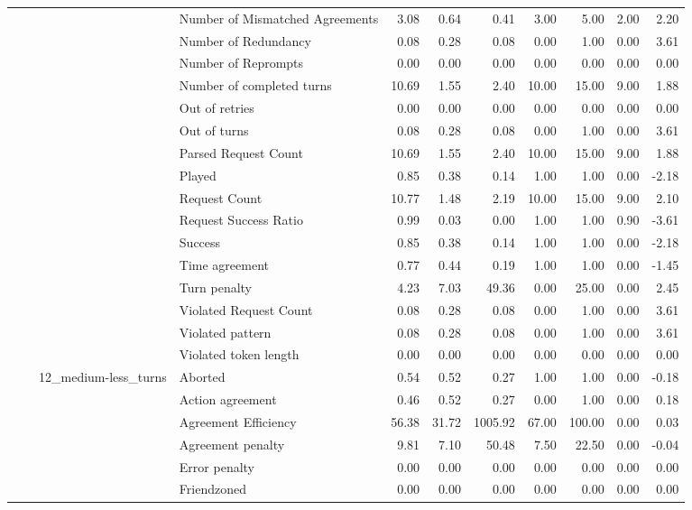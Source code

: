 \begin{tabular}{llllrrrrrrr}
 &  &  & Number of Mismatched Agreements & 3.08 & 0.64 & 0.41 & 3.00 & 5.00 & 2.00 & 2.20 \\
 &  &  & Number of Redundancy & 0.08 & 0.28 & 0.08 & 0.00 & 1.00 & 0.00 & 3.61 \\
 &  &  & Number of Reprompts & 0.00 & 0.00 & 0.00 & 0.00 & 0.00 & 0.00 & 0.00 \\
 &  &  & Number of completed turns & 10.69 & 1.55 & 2.40 & 10.00 & 15.00 & 9.00 & 1.88 \\
 &  &  & Out of retries & 0.00 & 0.00 & 0.00 & 0.00 & 0.00 & 0.00 & 0.00 \\
 &  &  & Out of turns & 0.08 & 0.28 & 0.08 & 0.00 & 1.00 & 0.00 & 3.61 \\
 &  &  & Parsed Request Count & 10.69 & 1.55 & 2.40 & 10.00 & 15.00 & 9.00 & 1.88 \\
 &  &  & Played & 0.85 & 0.38 & 0.14 & 1.00 & 1.00 & 0.00 & -2.18 \\
 &  &  & Request Count & 10.77 & 1.48 & 2.19 & 10.00 & 15.00 & 9.00 & 2.10 \\
 &  &  & Request Success Ratio & 0.99 & 0.03 & 0.00 & 1.00 & 1.00 & 0.90 & -3.61 \\
 &  &  & Success & 0.85 & 0.38 & 0.14 & 1.00 & 1.00 & 0.00 & -2.18 \\
 &  &  & Time agreement & 0.77 & 0.44 & 0.19 & 1.00 & 1.00 & 0.00 & -1.45 \\
 &  &  & Turn penalty & 4.23 & 7.03 & 49.36 & 0.00 & 25.00 & 0.00 & 2.45 \\
 &  &  & Violated Request Count & 0.08 & 0.28 & 0.08 & 0.00 & 1.00 & 0.00 & 3.61 \\
 &  &  & Violated pattern & 0.08 & 0.28 & 0.08 & 0.00 & 1.00 & 0.00 & 3.61 \\
 &  &  & Violated token length & 0.00 & 0.00 & 0.00 & 0.00 & 0.00 & 0.00 & 0.00 \\
\cline{3-11}
 &  & \multirow[t]{27}{*}{12_medium-less_turns} & Aborted & 0.54 & 0.52 & 0.27 & 1.00 & 1.00 & 0.00 & -0.18 \\
 &  &  & Action agreement & 0.46 & 0.52 & 0.27 & 0.00 & 1.00 & 0.00 & 0.18 \\
 &  &  & Agreement Efficiency & 56.38 & 31.72 & 1005.92 & 67.00 & 100.00 & 0.00 & 0.03 \\
 &  &  & Agreement penalty & 9.81 & 7.10 & 50.48 & 7.50 & 22.50 & 0.00 & -0.04 \\
 &  &  & Error penalty & 0.00 & 0.00 & 0.00 & 0.00 & 0.00 & 0.00 & 0.00 \\
 &  &  & Friendzoned & 0.00 & 0.00 & 0.00 & 0.00 & 0.00 & 0.00 & 0.00 \\

\end{tabular}
